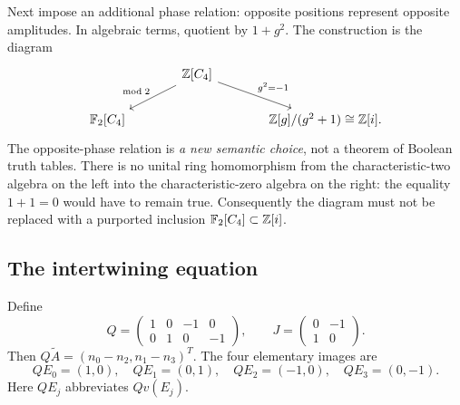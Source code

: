 Next impose an additional phase relation: opposite positions represent opposite amplitudes. In algebraic terms, quotient by $1+g^2$. The construction is the diagram
\begin{equation}\label{eq:commonlift}
 \begin{tikzcd}[column sep=large]
 & \Z[C_4] \arrow[dl,"\bmod 2"'] \arrow[dr,"g^2=-1"] & \\
 \F_2[C_4] && \Z[g]/(g^2+1)\cong\Z[i].
 \end{tikzcd}
\end{equation}
The opposite-phase relation is \emph{a new semantic choice}, not a theorem of Boolean truth tables. There is no unital ring homomorphism from the characteristic-two algebra on the left into the characteristic-zero algebra on the right: the equality $1+1=0$ would have to remain true. Consequently the diagram must not be replaced with a purported inclusion $\mathbb F_2[C_4]\subset\mathbb Z[i]$.

\subsection{The intertwining equation}
Define
\begin{equation}\label{eq:QJ}
 Q=\begin{pmatrix}1&0&-1&0\\0&1&0&-1\end{pmatrix},\qquad
 J=\begin{pmatrix}0&-1\\1&0\end{pmatrix}.
\end{equation}
Then $Q\widetilde A=(n_0-n_2,n_1-n_3)^T$. The four elementary images are
\begin{equation}
 QE_0=(1,0),\quad QE_1=(0,1),\quad QE_2=(-1,0),\quad QE_3=(0,-1).
\end{equation}
Here $QE_j$ abbreviates $Qv(E_j)$.

